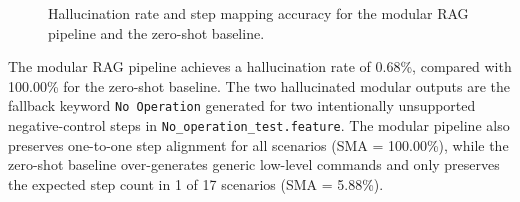 \begin{figure}[htbp]
\centering
{}
\caption{Hallucination rate and step mapping accuracy for the modular RAG pipeline and the zero-shot baseline.}
\label{fig:rag_pipeline_evaluation}
\end{figure}

The modular RAG pipeline achieves a hallucination rate of 0.68\%, compared with
100.00\% for the zero-shot baseline. The two hallucinated modular outputs are
the fallback keyword \texttt{No Operation} generated for two intentionally
unsupported negative-control steps in \texttt{No\_operation\_test.feature}. The
modular pipeline also preserves one-to-one step alignment for all scenarios
(SMA = 100.00\%), while the zero-shot baseline over-generates generic low-level
commands and only preserves the expected step count in 1 of 17 scenarios
(SMA = 5.88\%).
